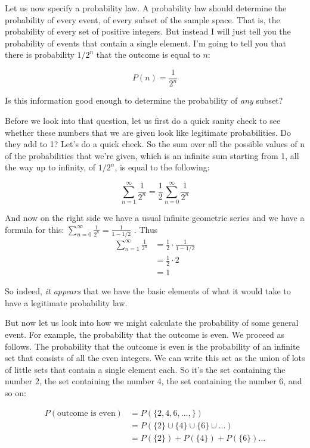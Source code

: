 \documentclass{tufte-handout}
\begin{document}
Let us now specify a probability law. A probability law should determine the probability of every event, of
every subset of the sample space. That is, the probability of every set of positive integers. But instead I
will just tell you the probability of events that contain a single element. I'm going to tell you that there is
probability $1/2^n$ that the outcome is equal to $n$:

$$
P(n) = \frac{1}{2^n}
$$


Is this information good
enough to determine the probability of \textit{any} subset?

Before we look into that question, let us first do a quick sanity check to see whether these numbers that
we are given look like legitimate probabilities. Do they add to 1? Let's do a quick check. So the sum
over all the possible values of n of the probabilities that we're given, which is an infinite sum starting
from 1, all the way up to infinity, of $1/2^n$, is equal to the following:

$$
\sum_{n=1}^{\infty} \frac{1}{2^n} = \frac{1}{2} \sum_{n=0}^{\infty} \frac{1}{2^n} 
$$

And now on the right side we have a usual infinite geometric series and we have a formula for this:
$\sum_{n=0}^{\infty} \frac{1}{2^n}  = \frac{1}{1 - 1/2}$ . Thus
\begin{align*}
\sum_{n=1}^{\infty} \frac{1}{2^n} &= \frac{1}{2} \cdot \frac{1}{1 - 1/2}\\
&= \frac{1}{2} \cdot 2\\
&= 1
\end{align*}

So indeed, \textit{it appears }that we have the basic elements of what
it would take to have a legitimate probability law.


\vspace{0.4cm}
But now let us look into how we might calculate the probability of some general event. For example, the
probability that the outcome is even. We proceed as follows. The probability that the outcome is even 
is the probability of an infinite set that consists of all the even integers. We can write this set as the
union of lots of little sets that contain a single element each. So it's the set containing the number 2, the
set containing the number 4, the set containing the number 6, and so on:


\begin{align*}
P( \text{outcome is even}) &= P(\{ 2, 4, 6, \ldots, \})\\
&= P(\{ 2\} \cup \{ 4\} \cup \{ 6\} \cup \ldots) \\
&= P(\{ 2\}) + P(\{ 4\}) + P(\{ 6\}) \ldots
\end{align*}
\end{document}
